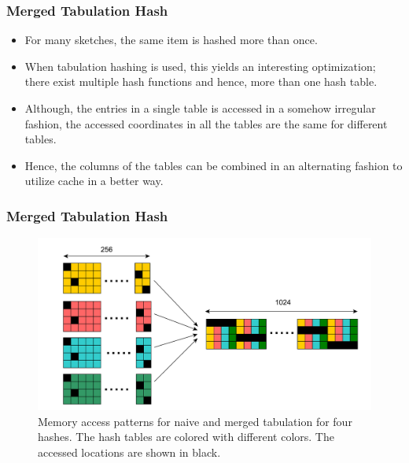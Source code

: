 \documentclass{beamer}
\begin{document}
\begin{frame}
\begin{figure}[H]
\begin{minipage}[c]{0.5\textwidth}
\begin{algorithm}[H]
			\label{algo:tabhash} 	
		\end{algorithm}
		\renewcommand{\baselinestretch}{1}
	\end{minipage}
\end{figure}
\end{frame}


\begin{frame}
	\frametitle{Merged Tabulation Hash}
	\begin{itemize}
	\item For many sketches, the same item is hashed more than once. 
	\item When tabulation hashing is used, this yields an interesting optimization; there exist multiple hash functions and hence, more than one hash table. 
	\item Although, the entries in a single table is accessed in a somehow irregular fashion, the accessed coordinates in all the tables are the same for different tables.
	\item Hence, the columns of the tables can be combined in an alternating fashion to utilize cache in a better way. 
		\end{itemize}
\end{frame}

\begin{frame}
	\frametitle{Merged Tabulation Hash}
		\begin{figure}[H]
			\includegraphics[scale=0.3]{merged_tabular_access.pdf}
			\caption{Memory access patterns for naive and merged tabulation for four hashes. The hash tables are colored with different colors. The accessed locations are shown in black.}
			\label{fig:merged_tabular_access}
	\end{figure}
\end{frame}
\end{document}
